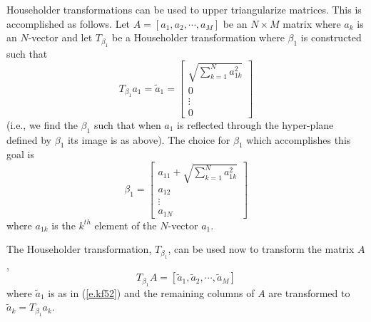 	Householder transformations can be used to 
upper triangularize matrices.  This is accomplished as
follows.  Let $A=[a_1,a_2,\cdots,a_M]$ be an $N\times M$ matrix
where $a_k$ is an $N$-vector and let $T_{\beta_1}$ be a 
Householder transformation where $\beta_1$ is
constructed such that
%
\begin{equation}
T_{\beta_1}a_1=\tilde{a}_1=
                     \left[\begin{array}{c}
                          \sqrt{\sum_{k=1}^{N}a_{1k}^2}\\
                          0\\
                          \vdots\\
                          0
                      \end{array}\right]
\label{e.kf52}
\end{equation}
%
(i.e., we find the $\beta_1$ such that when $a_1$ is reflected
through the hyper-plane defined by $\beta_1$ its image is
as above).  The choice for $\beta_1$ which accomplishes this goal is
%
\begin{equation}
\beta_1=\left[\begin{array}{c}
                          a_{11}+\sqrt{\sum_{k=1}^{N}a_{1k}^2}\\
                          a_{12}\\
                          \vdots\\
                          a_{1N}
                      \end{array}\right]
\label{e.kf53}
\end{equation}
%
where $a_{1k}$ is the $k^{th}$ element of the $N$-vector $a_1$.

	The Householder transformation, $T_{\beta_1}$, can be
used now to transform the matrix $A$,
%
\begin{equation}
T_{\beta_1}A=[\tilde{a}_1,\tilde{a}_2,\cdots,\tilde{a}_M]
\label{e.kf54}
\end{equation}
%
where $\tilde{a}_1$ is as in (\ref{e.kf52}) and the 
remaining columns of $A$ are transformed to $\tilde{a}_k=T_{\beta_1}a_k$.


